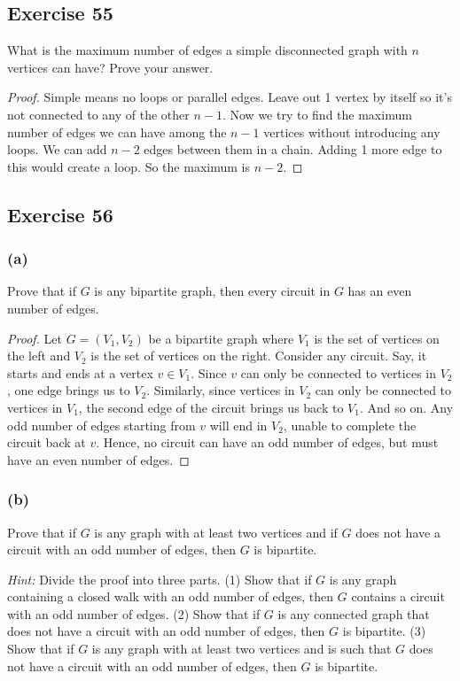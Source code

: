 \documentclass[14pt]{extarticle}
\begin{document}
\subsection{Exercise 55}
What is the maximum number of edges a simple disconnected graph with \(n\) vertices can have? Prove your answer.

\begin{proof}
    Simple means no loops or parallel edges. Leave out 1 vertex by itself so it's not connected to any of the other \(n-1\). Now
    we try to find the maximum number of edges we can have among the \(n-1\) vertices without introducing any loops. We can add
    \(n-2\) edges between them in a chain. Adding 1 more edge to this would create a loop. So the maximum is \(n-2\).
\end{proof}

\subsection{Exercise 56}
\subsubsection{(a)}
Prove that if \(G\) is any bipartite graph, then every circuit in \(G\) has an even number of edges.

\begin{proof}
    Let \(G = (V_1, V_2)\) be a bipartite graph where \(V_1\) is the set of vertices on the left and \(V_2\) is the set of
    vertices on the right. Consider any circuit. Say, it starts and ends at a vertex \(v \in V_1\). Since \(v\) can only be
    connected to vertices in \(V_2\), one edge brings us to \(V_2\). Similarly, since vertices in \(V_2\) can only be
    connected to vertices in \(V_1\), the second edge of the circuit brings us back to \(V_1\). And so on. Any odd number
    of edges starting from \(v\) will end in \(V_2\), unable to complete the circuit back at \(v\). Hence, no circuit can have
    an odd number of edges, but must have an even number of edges.
\end{proof}

\subsubsection{(b)}
Prove that if \(G\) is any graph with at least two vertices and if \(G\) does not have a circuit with an odd number of
edges, then \(G\) is bipartite.

    {\it Hint:} Divide the proof into three parts. (1) Show that if \(G\) is any graph containing a closed walk with an odd
number of edges, then \(G\) contains a circuit with an odd number of edges. (2) Show that if \(G\) is any connected graph
that does not have a circuit with an odd number of edges, then \(G\) is bipartite. (3) Show that if \(G\) is any graph with
at least two vertices and is such that \(G\) does not have a circuit with an odd number of edges, then \(G\) is bipartite.
\end{document}
